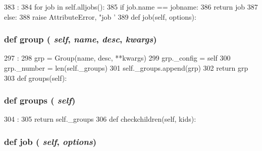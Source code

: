 \begin{DoxyCode}
383                            :
384         for job in self.alljobs():
385             if job.name == jobname:
386                 return job
387         else:
388             raise AttributeError, "job '%
389 
    def job(self, options):
\end{DoxyCode}
\hypertarget{classm5_1_1util_1_1jobfile_1_1Configuration_a47f703fc03b4740af29aa80f3ca41092}{
\subsubsection[{group}]{\setlength{\rightskip}{0pt plus 5cm}def group ( {\em self}, \/   {\em name}, \/   {\em desc}, \/   {\em kwargs})}}
\label{classm5_1_1util_1_1jobfile_1_1Configuration_a47f703fc03b4740af29aa80f3ca41092}



\begin{DoxyCode}
297                                          :
298         grp = Group(name, desc, **kwargs)
299         grp._config = self
300         grp._number = len(self._groups)
301         self._groups.append(grp)
302         return grp
303 
    def groups(self):
\end{DoxyCode}
\hypertarget{classm5_1_1util_1_1jobfile_1_1Configuration_a3c8f82f03a413047c5c3896bc4e75e63}{
\subsubsection[{groups}]{\setlength{\rightskip}{0pt plus 5cm}def groups ( {\em self})}}
\label{classm5_1_1util_1_1jobfile_1_1Configuration_a3c8f82f03a413047c5c3896bc4e75e63}



\begin{DoxyCode}
304                     :
305         return self._groups
306 
    def checkchildren(self, kids):
\end{DoxyCode}
\hypertarget{classm5_1_1util_1_1jobfile_1_1Configuration_a50c9f5300dde5d896ec122ed9569d48e}{
\subsubsection[{job}]{\setlength{\rightskip}{0pt plus 5cm}def job ( {\em self}, \/   {\em options})}}
\label{classm5_1_1util_1_1jobfile_1_1Configuration_a50c9f5300dde5d896ec122ed9569d48e}



